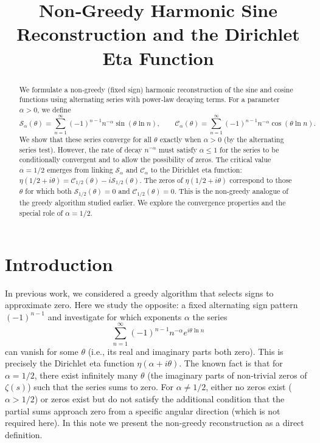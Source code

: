 \documentclass[12pt,a4paper]{article}
\title{Non‑Greedy Harmonic Sine Reconstruction and the Dirichlet Eta Function}
\author{}
\date{}
\begin{document}
\maketitle

\begin{abstract}
We formulate a non‑greedy (fixed sign) harmonic reconstruction of the sine and cosine functions using alternating series with power‑law decaying terms. For a parameter $\alpha>0$, we define
\[
\mathcal{S}_\alpha(\theta)=\sum_{n=1}^\infty (-1)^{n-1}n^{-\alpha}\sin(\theta\ln n),\qquad
\mathcal{C}_\alpha(\theta)=\sum_{n=1}^\infty (-1)^{n-1}n^{-\alpha}\cos(\theta\ln n).
\]
We show that these series converge for all $\theta$ exactly when $\alpha>0$ (by the alternating series test). However, the rate of decay $n^{-\alpha}$ must satisfy $\alpha\le 1$ for the series to be conditionally convergent and to allow the possibility of zeros. The critical value $\alpha=1/2$ emerges from linking $\mathcal{S}_\alpha$ and $\mathcal{C}_\alpha$ to the Dirichlet eta function: $\eta(1/2+i\theta)=\mathcal{C}_{1/2}(\theta)-i\mathcal{S}_{1/2}(\theta)$. The zeros of $\eta(1/2+i\theta)$ correspond to those $\theta$ for which both $\mathcal{S}_{1/2}(\theta)=0$ and $\mathcal{C}_{1/2}(\theta)=0$. This is the non‑greedy analogue of the greedy algorithm studied earlier. We explore the convergence properties and the special role of $\alpha=1/2$.
\end{abstract}

\section{Introduction}

In previous work, we considered a greedy algorithm that selects signs to approximate zero. Here we study the opposite: a fixed alternating sign pattern $(-1)^{n-1}$ and investigate for which exponents $\alpha$ the series
\[
\sum_{n=1}^\infty (-1)^{n-1} n^{-\alpha} e^{i\theta\ln n}
\]
can vanish for some $\theta$ (i.e., its real and imaginary parts both zero). This is precisely the Dirichlet eta function $\eta(\alpha+i\theta)$. The known fact is that for $\alpha=1/2$, there exist infinitely many $\theta$ (the imaginary parts of non‑trivial zeros of $\zeta(s)$) such that the series sums to zero. For $\alpha\neq1/2$, either no zeros exist ($\alpha>1/2$) or zeros exist but do not satisfy the additional condition that the partial sums approach zero from a specific angular direction (which is not required here). In this note we present the non‑greedy reconstruction as a direct definition.
\end{document}
